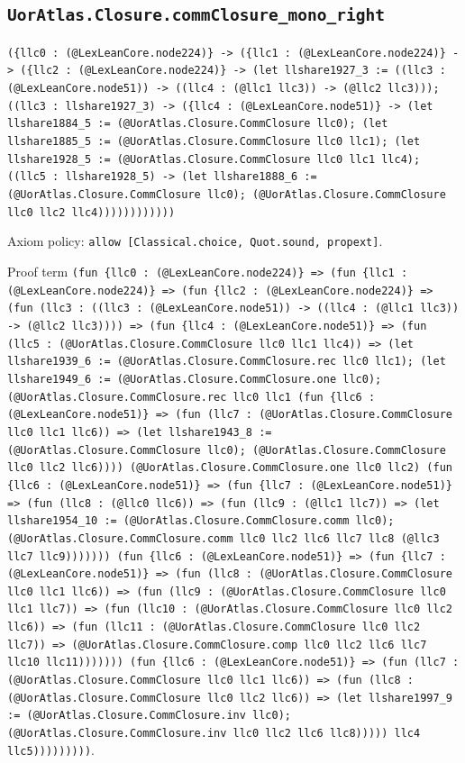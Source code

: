 \documentclass[11pt]{article}
\begin{document}
\subsection*{\texttt{UorAtlas.Closure.commClosure\_mono\_right}}
\noindent\texttt{(\{llc0 : (@LexLeanCore.node224)\} -> (\{llc1 : (@LexLeanCore.node224)\} -> (\{llc2 : (@LexLeanCore.node224)\} -> (let llshare1927\_3 := ((llc3 : (@LexLeanCore.node51)) -> ((llc4 : (@llc1 llc3)) -> (@llc2 llc3))); ((llc3 : llshare1927\_3) -> (\{llc4 : (@LexLeanCore.node51)\} -> (let llshare1884\_5 := (@UorAtlas.Closure.CommClosure llc0); (let llshare1885\_5 := (@UorAtlas.Closure.CommClosure llc0 llc1); (let llshare1928\_5 := (@UorAtlas.Closure.CommClosure llc0 llc1 llc4); ((llc5 : llshare1928\_5) -> (let llshare1888\_6 := (@UorAtlas.Closure.CommClosure llc0); (@UorAtlas.Closure.CommClosure llc0 llc2 llc4))))))))))))}\par
\noindent Axiom policy: \texttt{allow [Classical.choice, Quot.sound, propext]}.\par
\noindent Proof term \texttt{(fun \{llc0 : (@LexLeanCore.node224)\} => (fun \{llc1 : (@LexLeanCore.node224)\} => (fun \{llc2 : (@LexLeanCore.node224)\} => (fun (llc3 : ((llc3 : (@LexLeanCore.node51)) -> ((llc4 : (@llc1 llc3)) -> (@llc2 llc3)))) => (fun \{llc4 : (@LexLeanCore.node51)\} => (fun (llc5 : (@UorAtlas.Closure.CommClosure llc0 llc1 llc4)) => (let llshare1939\_6 := (@UorAtlas.Closure.CommClosure.rec llc0 llc1); (let llshare1949\_6 := (@UorAtlas.Closure.CommClosure.one llc0); (@UorAtlas.Closure.CommClosure.rec llc0 llc1 (fun \{llc6 : (@LexLeanCore.node51)\} => (fun (llc7 : (@UorAtlas.Closure.CommClosure llc0 llc1 llc6)) => (let llshare1943\_8 := (@UorAtlas.Closure.CommClosure llc0); (@UorAtlas.Closure.CommClosure llc0 llc2 llc6)))) (@UorAtlas.Closure.CommClosure.one llc0 llc2) (fun \{llc6 : (@LexLeanCore.node51)\} => (fun \{llc7 : (@LexLeanCore.node51)\} => (fun (llc8 : (@llc0 llc6)) => (fun (llc9 : (@llc1 llc7)) => (let llshare1954\_10 := (@UorAtlas.Closure.CommClosure.comm llc0); (@UorAtlas.Closure.CommClosure.comm llc0 llc2 llc6 llc7 llc8 (@llc3 llc7 llc9))))))) (fun \{llc6 : (@LexLeanCore.node51)\} => (fun \{llc7 : (@LexLeanCore.node51)\} => (fun (llc8 : (@UorAtlas.Closure.CommClosure llc0 llc1 llc6)) => (fun (llc9 : (@UorAtlas.Closure.CommClosure llc0 llc1 llc7)) => (fun (llc10 : (@UorAtlas.Closure.CommClosure llc0 llc2 llc6)) => (fun (llc11 : (@UorAtlas.Closure.CommClosure llc0 llc2 llc7)) => (@UorAtlas.Closure.CommClosure.comp llc0 llc2 llc6 llc7 llc10 llc11))))))) (fun \{llc6 : (@LexLeanCore.node51)\} => (fun (llc7 : (@UorAtlas.Closure.CommClosure llc0 llc1 llc6)) => (fun (llc8 : (@UorAtlas.Closure.CommClosure llc0 llc2 llc6)) => (let llshare1997\_9 := (@UorAtlas.Closure.CommClosure.inv llc0); (@UorAtlas.Closure.CommClosure.inv llc0 llc2 llc6 llc8))))) llc4 llc5)))))))))}.\par
\end{document}

